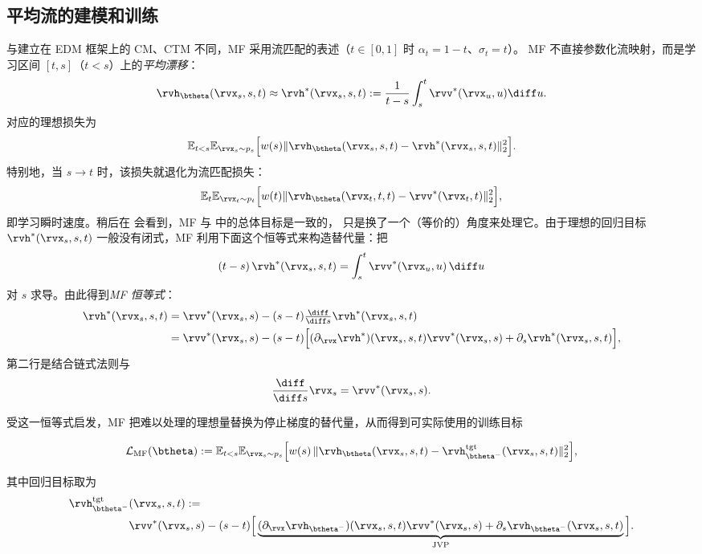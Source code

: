 \subsection{平均流的建模和训练}

与建立在 EDM 框架上的 CM、CTM 不同，MF 采用流匹配的表述（$t\in[0,1]$ 时 $\alpha_t = 1-t$、$\sigma_t  = t$）。
MF 不直接参数化流映射，而是学习区间 $[t,s]$（$t<s$）上的\emph{平均漂移}：
\[
\rvh_{\btheta}(\rvx_s, s, t)  \approx
\rvh^*(\rvx_s, s, t) := \frac{1}{t-s}\int_s^t \rvv^*(\rvx_u,u) \diff u.
\]
对应的理想损失为
\begin{align}\label{eq:mf-oracle}
\mathbb{E}_{t<s} \mathbb{E}_{\rvx_s\sim p_s}\Big[w(s)
\|\rvh_{\btheta}(\rvx_s,s,t) - \rvh^*(\rvx_s,s,t)\|_2^2\Big].
\end{align}
特别地，当 $s \to t$ 时，该损失就退化为流匹配损失：
\begin{align}\label{eq:mf-to-fm}
    \mathbb{E}_{t} \mathbb{E}_{\rvx_t\sim p_t}\Big[w(t)
\|\rvh_{\btheta}(\rvx_t,t,t) - \rvv^*(\rvx_t,t)\|_2^2\Big],
\end{align}
即学习瞬时速度。稍后在  会看到，MF 与  中的总体目标是一致的，
只是换了一个（等价的）角度来处理它。由于理想的回归目标 $\rvh^*(\rvx_s,s,t)$ 一般没有闭式，MF 利用下面这个恒等式来构造替代量：把
\[
(t-s)\,\rvh^*(\rvx_s,s,t) = \int_s^t \rvv^*(\rvx_u,u)\,\diff u
\]
对 $s$ 求导。由此得到\emph{MF 恒等式}：
\begin{align}\label{eq:mf-identity}
\begin{aligned}
    \rvh^*(\rvx_s,s,t)
&= \rvv^*(\rvx_s,s) - (s-t) \tfrac{\diff}{\diff s}\rvh^*(\rvx_s,s,t) \\
&= \rvv^*(\rvx_s,s) - (s-t)\Big[(\partial_{\rvx}\rvh^*)(\rvx_s,s,t) \rvv^*(\rvx_s,s)
+ \partial_s \rvh^*(\rvx_s,s,t)\Big],
\end{aligned}
\end{align}
第二行是结合链式法则与
\[
\frac{\diff}{\diff s}\rvx_s = \rvv^*(\rvx_s,s).
\]

受这一恒等式启发，MF 把难以处理的理想量替换为停止梯度的替代量，从而得到可实际使用的训练目标
\begin{mdframed}
\begin{align}\label{eq:mf-practice}
    \mathcal{L}_{\mathrm{MF}}(\btheta)
:= \mathbb{E}_{t<s} \mathbb{E}_{\rvx_s\sim p_s}\Big[w(s)\,
\|\rvh_{\btheta}(\rvx_s,s,t) - \rvh_{\btheta^-}^{\mathrm{tgt}}(\rvx_s,s,t)\|_2^2\Big],
\end{align}
\end{mdframed}
其中回归目标取为
\begin{align*}
    \rvh_{\btheta^-}^{\mathrm{tgt}}&(\rvx_s,s,t)
:= \\ &\rvv^*(\rvx_s,s) - (s-t)\Big[\underbrace{(\partial_{\rvx}\rvh_{\btheta^-})(\rvx_s,s,t) \rvv^*(\rvx_s,s)
+ \partial_s \rvh_{\btheta^-}(\rvx_s,s,t)}_{\mathrm{JVP}}\Big].
\end{align*}

